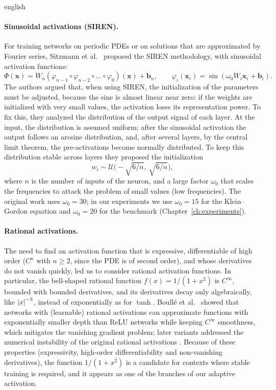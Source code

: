 \documentclass[0000.tex]{subfiles}
\begin{document}
\begin{hyphenrules}{english}
\paragraph{Sinusoidal activations (SIREN).}
For training networks on periodic PDEs or on solutions that are approximated by Fourier series,
Sitzmann et al.~\cite{sitzmann2020} proposed the SIREN methodology, with sinusoidal activation functions:
\begin{equation}
  \Phi(\mathbf{x})=W_n(\varphi_{n-1}\circ\varphi_{n-2}\circ\dots\circ\varphi_0)(\mathbf{x})+\mathbf{b}_n,\qquad
  \varphi_i(\mathbf{x}_i)=\sin(\omega_0W_i\mathbf{x}_i+\mathbf{b}_i).
  \label{eq:siren}
\end{equation}
The authors argued that, when using SIREN, the initialization of the parameters must be adjusted, because
the sine is almost linear near zero: if the weights are initialized with very small values, the activation
loses its representation power. To fix this, they analyzed the distribution of the output signal of each
layer. At the input, the distribution is assumed uniform; after the sinusoidal activation the output
follows an arcsine distribution, and, after several layers, by the central limit theorem, the
pre-activations become normally distributed. To keep this distribution stable across layers they proposed
the initialization
\begin{equation}
  w_i\sim\mathcal{U}\Big(-\sqrt{6/n},\ \sqrt{6/n}\Big),
  \label{eq:siren-init}
\end{equation}
where $n$ is the number of inputs of the neuron, and a large factor $\omega_0$ that scales the frequencies
to attack the problem of small values (low frequencies). The original work uses $\omega_0=30$; in our
experiments we use $\omega_0=15$ for the Klein--Gordon equation and $\omega_0=20$ for the benchmark
(Chapter~\ref{ch:experiments}).

\paragraph{Rational activations.}
The need to find an activation function that is expressive, differentiable of high order ($C^n$ with
$n\ge2$, since the PDE is of second order), and whose derivatives do not vanish quickly, led us to
consider rational activation functions. In particular, the bell-shaped rational function
$f(x)=1/(1+x^2)$ is $C^\infty$, bounded with bounded derivatives, and its derivatives decay only
algebraically, like $\left\lvert x \right\rvert^{-3}$, instead of exponentially as for $\tanh$. Boull{\'e} et al.~\cite{boulle2020} showed
that networks with (learnable) rational activations can approximate functions with exponentially smaller
depth than ReLU networks while keeping $C^\infty$ smoothness, which mitigates the vanishing gradient
problem; later variants addressed the numerical instability of the original rational activations
\cite{dubey2022}. Because of these properties (expressivity, high-order differentiability and
non-vanishing derivatives), the function $1/(1+x^2)$ is a candidate for contexts where stable training is
required, and it appears as one of the branches of our adaptive activation.


\end{hyphenrules}
\end{document}
